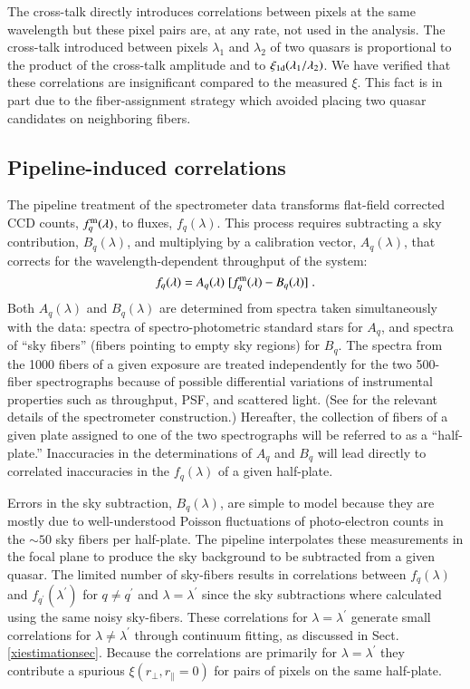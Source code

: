 \documentclass{aa}
\newcommand{\xionedim}{\xi_{\rm 1d}}
\newcommand{\xif}{\xi}
\newcommand{\fqlam}{f_q(\lambda)}
\newcommand{\rperp}{r_\perp}
\newcommand{\rpar}{r_\parallel}
\begin{document}
The cross-talk directly introduces correlations between pixels
at the same wavelength but these pixel pairs are, at any rate, not
used in the analysis.
The cross-talk introduced between pixels $\lambda_1$ and $\lambda_2$ of 
two quasars
is proportional to the product of the cross-talk amplitude
and to $\xionedim(\lambda_1/\lambda_2)$.
We have verified that these correlations are insignificant compared to
the measured $\xif$.  This fact is in part due to the fiber-assignment
strategy which avoided placing two quasar candidates
on neighboring fibers. 

\subsection{Pipeline-induced correlations}

The pipeline treatment of the spectrometer data
transforms flat-field corrected  CCD counts, $f_q^{\rm m}(\lambda)$,
to fluxes, $\fqlam$.  This process requires subtracting a 
sky contribution, $B_q(\lambda)$,
and multiplying by a calibration vector, $A_q(\lambda)$,
that corrects for the wavelength-dependent throughput of
the system:
\begin{equation}
\fqlam = A_q(\lambda)\;[f_q^{\rm m}(\lambda) - B_q(\lambda)] \;.
\end{equation}
Both $A_q(\lambda)$ and  $B_q(\lambda)$ are determined  from
spectra taken simultaneously with the data: spectra of
spectro-photometric standard stars for $A_q$, and spectra
of ``sky fibers''  (fibers pointing to empty sky regions) for $B_q$.
The spectra from the 1000 fibers
of a given exposure are treated independently for
the two 500-fiber spectrographs because
of possible differential variations of instrumental properties
such as throughput, PSF, and scattered light. 
(See \citet{2013AJ....146...32S} for the relevant details of
the spectrometer construction.)
Hereafter, the collection of fibers of a 
given plate assigned to one of the two spectrographs will be 
referred to as a ``half-plate.''
Inaccuracies in the 
determinations of $A_q$ and $B_q$ will lead directly to correlated
inaccuracies in the $\fqlam$ of a given half-plate.


Errors in the sky subtraction, $B_q(\lambda)$,  are simple to model because they
are mostly due to well-understood Poisson fluctuations of 
photo-electron counts in the 
$\sim50$  
sky fibers per half-plate.
The pipeline interpolates these
measurements in the focal plane to produce the sky background to be subtracted 
from a given quasar.  
The limited number of sky-fibers results in 
correlations between $\fqlam$ and 
$f_{q^\prime}(\lambda^\prime)$ for $q\neq q^\prime$ and $\lambda=\lambda^\prime$
since the sky subtractions 
where calculated using the same noisy sky-fibers.
These correlations for $\lambda=\lambda^\prime$ generate small
correlations for $\lambda\ne\lambda^\prime$ through continuum
fitting, as discussed in Sect. \ref{xiestimationsec}.
Because the correlations are 
primarily for  $\lambda=\lambda^\prime$
they contribute a spurious $\xif(\rperp,\rpar=0)$
for pairs of pixels on the same half-plate.
\end{document}
